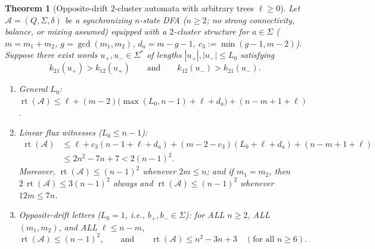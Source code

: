 \documentclass[11pt,a4paper]{article}
\newtheorem{theorem}{Theorem}[section]
\theoremstyle{definition}
\theoremstyle{remark}
\newcommand{\rt}{\operatorname{rt}}
\newcommand{\cA}{\mathcal{A}}
\begin{document}
\begin{theorem}[Opposite-drift $2$-cluster automata with arbitrary trees $\ell \ge 0$]
\label{thm:opp-drift}
Let $\cA = (Q, \Sigma, \delta)$ be a synchronizing $n$-state DFA ($n \ge 2$; no strong connectivity, balance, or mixing assumed) equipped with a $2$-cluster structure for $a \in \Sigma$ ($m = m_1 + m_2$, $g = \gcd(m_1, m_2)$, $d_a = m - g - 1$, $c_3 := \min(g - 1, m - 2)$). Suppose there exist words $u_+, u_- \in \Sigma^*$ of lengths $|u_+|, |u_-| \le L_0$ satisfying
\[
  k_{21}(u_+) > k_{12}(u_+) \qquad\text{and}\qquad k_{12}(u_-) > k_{21}(u_-).
\]
\begin{enumerate}[label=(\arabic*),nosep]
  \item \emph{General $L_0$:} $\rt(\cA) \le \ell + (m - 2)\bigl(\max(L_0, n - 1) + \ell + d_a\bigr) + (n - m + 1 + \ell)$.
  \item \emph{Linear flux witnesses ($L_0 \le n - 1$):}
  \begin{align*}
    \rt(\cA) &\le \ell + c_3(n - 1 + \ell + d_a) + (m - 2 - c_3)(L_0 + \ell + d_a) + (n - m + 1 + \ell) \\
             &\le 2n^2 - 7n + 7 < 2(n-1)^2.
  \end{align*}
  Moreover, $\rt(\cA) \le (n-1)^2$ whenever $2m \le n$; and if $m_1 = m_2$, then $2\,\rt(\cA) \le 3(n-1)^2$ always and $\rt(\cA) \le (n-1)^2$ whenever $12m \le 7n$.
  \item \emph{Opposite-drift letters ($L_0 = 1$, i.e., $b_+, b_- \in \Sigma$):} for ALL $n \ge 2$, ALL $(m_1, m_2)$, and ALL $\ell \le n - m$,
  \[
    \rt(\cA) \le (n - 1)^2, \qquad\text{and}\qquad \rt(\cA) \le n^2 - 3n + 3 \quad (\text{for all } n \ge 6).
  \]
\end{enumerate}
\end{theorem}
\end{document}
